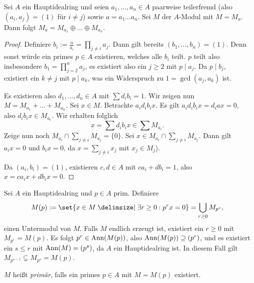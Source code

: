 \documentclass[12pt,a4paper]{scrartcl}
\theoremstyle{cplain}
\theoremstyle{cdef}
\begin{document}
\begin{lem} \label{lem:zerlegung ueber hir}
	Sei $A$ ein Hauptidealring und seien $a_1,\dots, a_n\in A$ paarweise teilerfremd (also $(a_i, a_j) = (1)$ für $i \neq j$) sowie $a = a_1\dots a_n$. Sei $M$ der $A$-Modul mit $M = M_a$. Dann folgt $M_a = M_{a_1}\oplus \dots \oplus M_{a_n}$.
\end{lem}
\begin{proof}
	Definiere $b_i := \frac{a}{a_i} = \prod_{j\neq i} a_j$. Dann gilt bereits $(b_1,\dots, b_n) = (1)$. Denn sonst würde ein primes $p\in A$ existieren, welches alle $b_i$ teilt. $p$ teilt also insbesondere $b_1 = \prod_{j = 2}^n a_j$, es existiert also ein $j\ge 2$ mit $p \mid a_j$. Da $p \mid b_j$, existiert ein $k\neq j$ mit $p \mid a_k$, was ein Widerspruch zu $1 = \gcd(a_j,a_k)$ ist.
	
	Es existieren also $d_1,\dots, d_n\in A$ mit $\sum d_ib_i = 1$. Wir zeigen nun $M = M_{a_1}+\dots +M_{a_n}$. Sei $x\in M$. Betrachte $a_id_ib_ix$. Es gilt $a_id_ib_ix = d_iax = 0$, also $d_ib_ix\in M_{a_i}$. Wir erhalten folglich \[ x = \sum d_ib_ix \in \sum M_{a_i}. \]
	Zeige nun noch $M_{a_i}\cap \sum_{j\neq i}M_{a_j} = \{0\}$. Sei $x\in M_{a_i}\cap\sum_{j \neq i}M_{a_j}$. Dann gilt $a_ix = 0$ und $b_ix = 0$, da $x = \sum_{j \neq i} x_j$ mit $x_j\in M_j$).
	
	Da $(a_i,b_i)= (1)$, existieren $c,d\in A$ mit $ca_i+db_i = 1$, also $x = ca_ix+db_ix = 0$.
\end{proof}

\begin{defi}
	Sei $A$ ein Hauptidealring und $p\in A$ prim. Definiere
	\[M(p) := \set{x\in M \given \exists r\ge 0: p^rx = 0} = \bigcup\limits_{r\ge 0} M_{p^r}, \]
	einen Untermodul von $M$. Falls $M$ endlich erzeugt ist, existiert ein $r\ge 0$ mit $M_{p^r} = M(p)$. Es folgt $p^r\in \operatorname{Ann}(M(p))$, also $\operatorname{Ann}(M(p))\supseteq (p^r)$, und es existiert ein $s\le r$ mit $\operatorname{Ann}(M) = (p^s)$, da $A$ ein Hauptidealring ist. In diesem Fall gilt $M_{p^{s-1}}\subsetneq M_{p^s} = M(p)$.
	
	$M$ heißt \emph{primär}, falls ein primes $p\in A$ mit $M = M(p)$ existiert.
\end{defi}	
\end{document}
